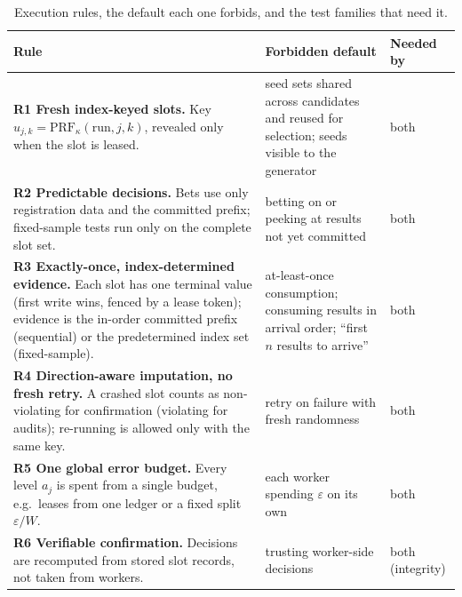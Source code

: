 \documentclass[11pt]{article}
\theoremstyle{definition}
\begin{document}
\begin{table}[!htbp]\centering\small
\caption{Execution rules, the default each one forbids, and the test families that need it.}\label{tab:rules}
\renewcommand{\arraystretch}{1.25}
\begin{tabularx}{\linewidth}{>{\raggedright}X>{\raggedright}p{4.6cm}>{\raggedright\arraybackslash}p{1.7cm}}
\toprule
Rule & Forbidden default & Needed by \\\midrule
\textbf{R1 Fresh index-keyed slots.} Key $u_{j,k}=\mathrm{PRF}_\kappa(\text{run},j,k)$, revealed only when the slot is leased. & seed sets shared across candidates and reused for selection; seeds visible to the generator & both \\
\textbf{R2 Predictable decisions.} Bets use only registration data and the committed prefix; fixed-sample tests run only on the complete slot set. & betting on or peeking at results not yet committed & both \\
\textbf{R3 Exactly-once, index-determined evidence.} Each slot has one terminal value (first write wins, fenced by a lease token); evidence is the in-order committed prefix (sequential) or the predetermined index set (fixed-sample). & at-least-once consumption; consuming results in arrival order; ``first $n$ results to arrive'' & both \\
\textbf{R4 Direction-aware imputation, no fresh retry.} A crashed slot counts as non-violating for confirmation (violating for audits); re-running is allowed only with the same key. & retry on failure with fresh randomness & both \\
\textbf{R5 One global error budget.} Every level $a_j$ is spent from a single budget, e.g.\ leases from one ledger or a fixed split $\varepsilon/W$. & each worker spending $\varepsilon$ on its own & both \\
\textbf{R6 Verifiable confirmation.} Decisions are recomputed from stored slot records, not taken from workers. & trusting worker-side decisions & both (integrity) \\
\bottomrule\end{tabularx}
\end{table}
\end{document}
